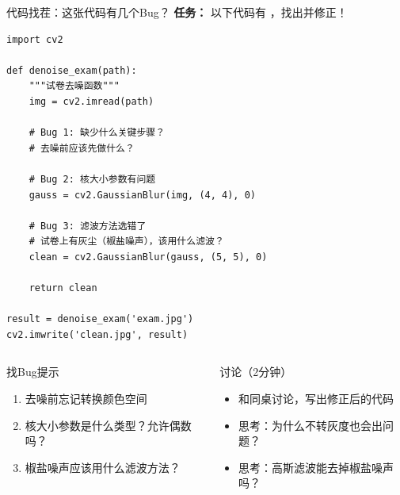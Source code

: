 \begin{frame}[fragile]{代码找茬：这张代码有几个Bug？}
	\textbf{任务：} 以下代码有 ，找出并修正！

	\vspace{0.2cm}

	\begin{lstlisting}[basicstyle=\ttfamily\tiny,title={\textbf{有Bug的去噪代码} -- 请找出3个错误}]
import cv2

def denoise_exam(path):
    """试卷去噪函数"""
    img = cv2.imread(path)

    # Bug 1: 缺少什么关键步骤？
    # 去噪前应该先做什么？

    # Bug 2: 核大小参数有问题
    gauss = cv2.GaussianBlur(img, (4, 4), 0)

    # Bug 3: 滤波方法选错了
    # 试卷上有灰尘（椒盐噪声），该用什么滤波？
    clean = cv2.GaussianBlur(gauss, (5, 5), 0)

    return clean

result = denoise_exam('exam.jpg')
cv2.imwrite('clean.jpg', result)
	\end{lstlisting}

	\vspace{0.2cm}

	\begin{columns}
		\begin{alertblock}{找Bug提示}
			\begin{enumerate}
				\item 去噪前忘记转换颜色空间
				\item 核大小参数是什么类型？允许偶数吗？
				\item 椒盐噪声应该用什么滤波方法？
			\end{enumerate}
		\end{alertblock}

		\begin{block}{讨论（2分钟）}
			\begin{itemize}
				\item 和同桌讨论，写出修正后的代码
				\item 思考：为什么不转灰度也会出问题？
				\item 思考：高斯滤波能去掉椒盐噪声吗？
			\end{itemize}
		\end{block}
	\end{columns}
\end{frame}
